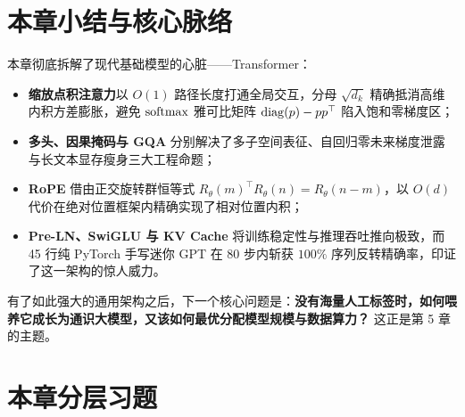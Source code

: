 \section*{本章小结与核心脉络}

本章彻底拆解了现代基础模型的心脏——Transformer：
\begin{itemize}
  \item \textbf{缩放点积注意力}以 $O(1)$ 路径长度打通全局交互，分母 $\sqrt{d_k}$ 精确抵消高维内积方差膨胀，避免 $\operatorname{softmax}$ 雅可比矩阵 $\operatorname{diag}(p) - pp^\top$ 陷入饱和零梯度区；
  \item \textbf{多头、因果掩码与 GQA} 分别解决了多子空间表征、自回归零未来梯度泄露与长文本显存瘦身三大工程命题；
  \item \textbf{RoPE} 借由正交旋转群恒等式 $R_\theta(m)^\top R_\theta(n) = R_\theta(n-m)$，以 $O(d)$ 代价在绝对位置框架内精确实现了相对位置内积；
  \item \textbf{Pre-LN、SwiGLU 与 KV Cache} 将训练稳定性与推理吞吐推向极致，而 45 行纯 PyTorch 手写迷你 GPT 在 80 步内斩获 $100\%$ 序列反转精确率，印证了这一架构的惊人威力。
\end{itemize}
有了如此强大的通用架构之后，下一个核心问题是：\textbf{没有海量人工标签时，如何喂养它成长为通识大模型，又该如何最优分配模型规模与数据算力？} 这正是第 5 章的主题。

\section*{本章分层习题}


